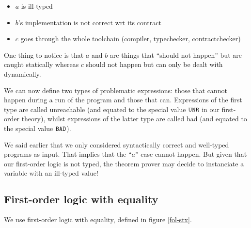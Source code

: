 \documentclass[preprint]{sigplanconf}
\begin{document}
\begin{itemize}
\item $a$ is ill-typed
\item $b$'s implementation is not correct wrt its contract
\item $c$ goes through the whole toolchain (compiler, typechecker, contractchecker)
\end{itemize}

One thing to notice is that $a$ and $b$ are things that ``should not
happen'' but are caught statically whereas $c$ should not happen but
can only be dealt with dynamically.

We can now define two types of problematic expressions: those that
cannot happen during a run of the program and those that can.
Expressions of the first type are called unreachable (and equated to
the special value $\texttt{UNR}$ in our first-order theory), whilst
expressions of the latter type are called bad (and equated to the
special value $\texttt{BAD}$).

We said earlier that we only considered syntactically correct and
well-typed programs as input. That implies that the ``$a$'' case
cannot happen. But given that our first-order logic is not typed, the
theorem prover may decide to instanciate a variable with an ill-typed
value! 

\subsection{First-order logic with equality}
We use first-order logic with equality, defined in figure \ref{fol-stx}.
\end{document}

